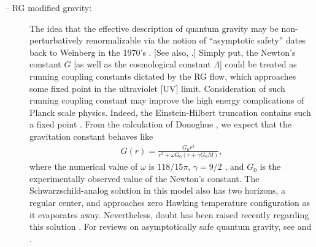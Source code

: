 \documentclass[12pt]{article}
\newcommand{\2}{$^2$}
\newcommand{\3}{$^3$}
\newcommand{\4}{$_4$}
\newcommand{\5}{$_5$}
\begin{document}
\begin{description}
\item[-- RG modified gravity:]  
The idea that the effective description of quantum gravity may be non-perturbatively renormalizable via the notion of ``asymptotic safety'' dates back to Weinberg in the 1970's \cite{weinberg1, weinberg2}. [See also, \cite{weinberg3}.]
Simply put, the Newton's constant $G$ [as well as the cosmological constant $\Lambda$] could be treated as running coupling constants dictated by the RG flow, which approaches  some fixed point in the ultraviolet [UV] limit. Consideration of such running coupling constant may improve the high energy complications of Planck scale physics. 
Indeed, the Einstein-Hilbert truncation contains such a fixed point \cite{reuter}.
From the calculation of Donoghue \cite{Donoghue:1994dn}, we expect that the gravitation constant behaves like
\begin{eqnarray}
{G}(r) = \frac{G_0r^{3}}{r^{3} + \omega G_0 \left(r+ \gamma G_0M \right)},
\end{eqnarray}
where the numerical value of $\omega$ is $118/15\pi$, $\gamma = 9/2$ \cite{Bonanno:2000ep}, and
$G_0$ is the experimentally observed value of the Newton's constant.
 The Schwarzschild-analog solution in this model also has two horizons, a regular center, and approaches zero Hawking temperature configuration as it evaporates away. Nevertheless, doubt has been raised recently regarding this solution \cite{maziashvili}. 
For reviews on asymptotically safe quantum gravity, see \cite{0610018} and \cite{0709.3851}.


\end{description}
\end{document}
